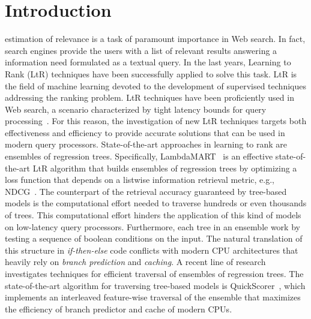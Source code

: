 
\section{Introduction}
\label{sec:introduction}

 estimation of relevance is a task of paramount importance in Web search. In fact, search engines provide the users with a list of relevant results answering a information need formulated as a textual query. In the last years, Learning to Rank (LtR) techniques have been successfully applied to solve this task. LtR is the field of machine learning devoted to the development of supervised techniques addressing the ranking problem. LtR techniques have been proficiently used in Web search, a scenario characterized by tight latency bounds for query processing~\cite{cambazoglu2011scalability}. For this reason, the investigation of new LtR techniques targets both effectiveness and efficiency to provide accurate solutions that can be used in modern query processors. State-of-the-art approaches in learning to rank are ensembles of regression trees. Specifically, LambdaMART~\cite{burges2010ranknet} is an effective state-of-the-art LtR algorithm that builds ensembles of regression trees by optimizing a loss function that depends on a listwise information retrieval metric, e.g., NDCG~\cite{jarvelin2002cumulated}. The counterpart of the retrieval accuracy guaranteed by tree-based models is the computational effort needed to traverse hundreds or even thousands of trees. This computational effort hinders the application of this kind of models on low-latency query processors. Furthermore, each tree in an ensemble work by testing a sequence of boolean conditions on the input. The natural translation of this structure in \textit{if-then-else} code conflicts with modern CPU architectures that heavily rely on \textit{branch prediction} and \textit{caching}. A recent line of research investigates techniques for efficient traversal of ensembles of regression trees. The state-of-the-art algorithm for traversing tree-based models is QuickScorer~\cite{lucchese2015quickscorer,dato2016fast,8035185,lucchese2016exploiting}, which implements an interleaved feature-wise traversal of the ensemble that maximizes the efficiency of branch predictor and cache of modern CPUs.

